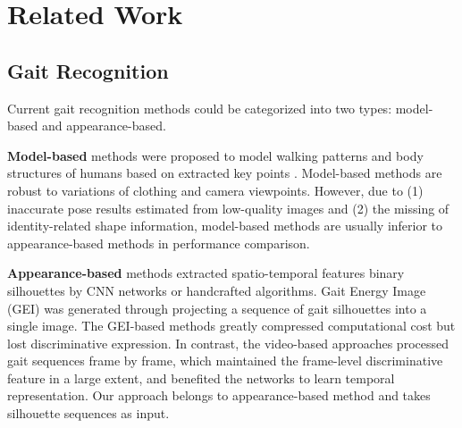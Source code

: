 \documentclass[journal]{IEEEtran}
\begin{document}
\section{Related Work}
\label{related_work}
\subsection{Gait Recognition}
Current gait recognition methods could be categorized into two types: model-based and appearance-based.

\textbf{Model-based} methods \cite{liao2020model, liao2017pose, teepe2021gaitgraph, huang2023condition} were proposed to model walking patterns and body structures of humans based on extracted key points \cite{cao2019openpose, sun2019deep, cao2017realtime}. Model-based methods are robust to variations of clothing and camera viewpoints. However, due to (1) inaccurate pose results estimated from low-quality images and (2) the missing of identity-related shape information, model-based methods are usually inferior to appearance-based methods in performance comparison.
 
\textbf{Appearance-based} methods \cite{chao2021gaitset, fan2020gaitpart, hou2020gait, lin2020gait, zhang2019cross, wolf2016multi, han2005individual, he2018multi, wu2016comprehensive, hu2013view} extracted spatio-temporal features binary silhouettes by CNN networks or handcrafted algorithms. Gait Energy Image (GEI) \cite{han2005individual} was generated through projecting a sequence of gait silhouettes into a single image. The GEI-based methods \cite{han2005individual, he2018multi, wu2016comprehensive, hu2013view, li2020gait, xu2020cross} greatly compressed computational cost but lost discriminative expression. In contrast, the video-based approaches \cite{chao2021gaitset, fan2020gaitpart, hou2020gait, lin2020gait, zhang2019cross, zhang2020learning, GaitGL, local3D, cui2022gaittransformer, huang2022star} processed gait sequences frame by frame, which maintained the frame-level discriminative feature in a large extent, and benefited the networks to learn temporal representation. Our approach belongs to appearance-based method and takes silhouette sequences as input.
\end{document}

